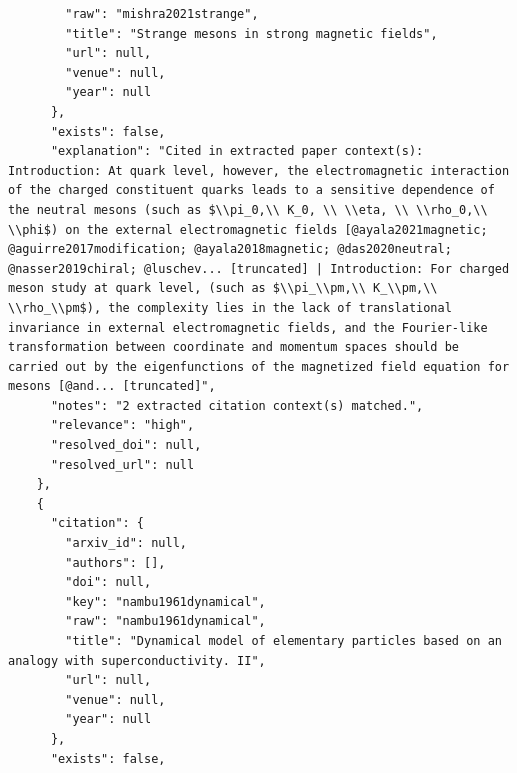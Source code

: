 \documentclass[11pt]{article}
\begin{document}
\begin{verbatim}
        "raw": "mishra2021strange",
        "title": "Strange mesons in strong magnetic fields",
        "url": null,
        "venue": null,
        "year": null
      },
      "exists": false,
      "explanation": "Cited in extracted paper context(s): Introduction: At quark level, however, the electromagnetic interaction of the charged constituent quarks leads to a sensitive dependence of the neutral mesons (such as $\\pi_0,\\ K_0, \\ \\eta, \\ \\rho_0,\\ \\phi$) on the external electromagnetic fields [@ayala2021magnetic; @aguirre2017modification; @ayala2018magnetic; @das2020neutral; @nasser2019chiral; @luschev... [truncated] | Introduction: For charged meson study at quark level, (such as $\\pi_\\pm,\\ K_\\pm,\\ \\rho_\\pm$), the complexity lies in the lack of translational invariance in external electromagnetic fields, and the Fourier-like transformation between coordinate and momentum spaces should be carried out by the eigenfunctions of the magnetized field equation for mesons [@and... [truncated]",
      "notes": "2 extracted citation context(s) matched.",
      "relevance": "high",
      "resolved_doi": null,
      "resolved_url": null
    },
    {
      "citation": {
        "arxiv_id": null,
        "authors": [],
        "doi": null,
        "key": "nambu1961dynamical",
        "raw": "nambu1961dynamical",
        "title": "Dynamical model of elementary particles based on an analogy with superconductivity. II",
        "url": null,
        "venue": null,
        "year": null
      },
      "exists": false,

\end{verbatim}
\end{document}
